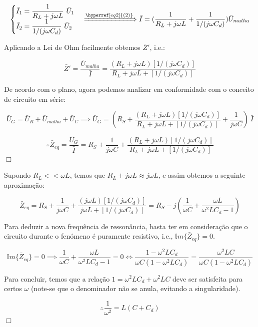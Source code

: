 $$
    \begin{cases}
        \bar{I}_1 = \dfrac{1}{R_L + j\omega L}\ \bar{U}_1\\
        \bar{I}_2 = \dfrac{1}{1/(j\omega C_d)}\ \bar{U}_2
    \end{cases}
    \xRightarrow[]{\hyperref[eq2]{(2)}}
    \bar{I} = (\frac{1}{R_L + j\omega L} + \frac{1}{1/(j\omega C_d)})\bar{U}_{malha} 
$$

Aplicando a Lei de Ohm facilmente obtemos $\bar{Z}'$, i.e.:

$$
    \bar{Z}' = \frac{\bar{U}_{malha}}{\bar{I}} = \frac{(R_L + j\omega L)[1/(j\omega C_d)]}{R_L + j\omega L + [1/(j\omega C_d)]}
$$

De acordo com o plano, agora podemos analizar em conformidade com o conceito de circuito em série:

$$
\bar{U}_G = \bar{U}_R + \bar{U}_{malha} + \bar{U}_C \implies \bar{U}_G = (R_S + \frac{(R_L + j\omega L)[1/(j\omega C_d)]}{R_L + j\omega L + [1/(j\omega C_d)]} + \frac{1}{j\omega C})\ \bar{I}
$$

$$
\therefore \bar{Z}_{eq} = \frac{\bar{U}_G}{\bar{I}} = R_S + \frac{1}{j\omega C} + \frac{(R_L + j\omega L)[1/(j\omega C_d)]}{R_L + j\omega L + [1/(j\omega C_d)]}
$$
\hfill \ensuremath{\Box}

Supondo $R_L << \omega L$, temos que $R_L + j\omega L \approx j\omega L$, e assim obtemos a seguinte aproximação:

$$
\bar{Z}_{eq} = R_S + \frac{1}{j\omega C} + \frac{(j\omega L)[1/(j\omega C_d)]}{j\omega L + [1/(j\omega C_d)]} = R_S - j(\frac{1}{\omega C} + \frac{\omega L}{\omega^2 L C_d - 1})
$$

Para deduzir a nova frequência de ressonância, basta ter em consideração que o circuito durante o fenómeno é puramente resistivo, i.e., $\mathbb{I}m\{\bar{Z}_{eq}\} = 0$.

$$
\mathbb{I}m\{\bar{Z}_{eq}\} = 0
\implies
\frac{1}{\omega C} + \frac{\omega L}{\omega^2 L C_d - 1} = 0
\iff
\frac{1-\omega^2 L C_d}{\omega C(1-\omega^2 L C_d)} = \frac{\omega^2 L C}{\omega C(1-\omega^2 L C_d)}
$$

Para concluir, temos que a relação $1 = \omega^2 L C_d + \omega^2 L C$ deve ser satisfeita para certos $\omega$ (note-se que o denominador não se anula, evitando a singularidade).

$$
    \therefore \frac{1}{\omega^2} = L(C + C_d)
$$
\hfill \ensuremath{\Box}
